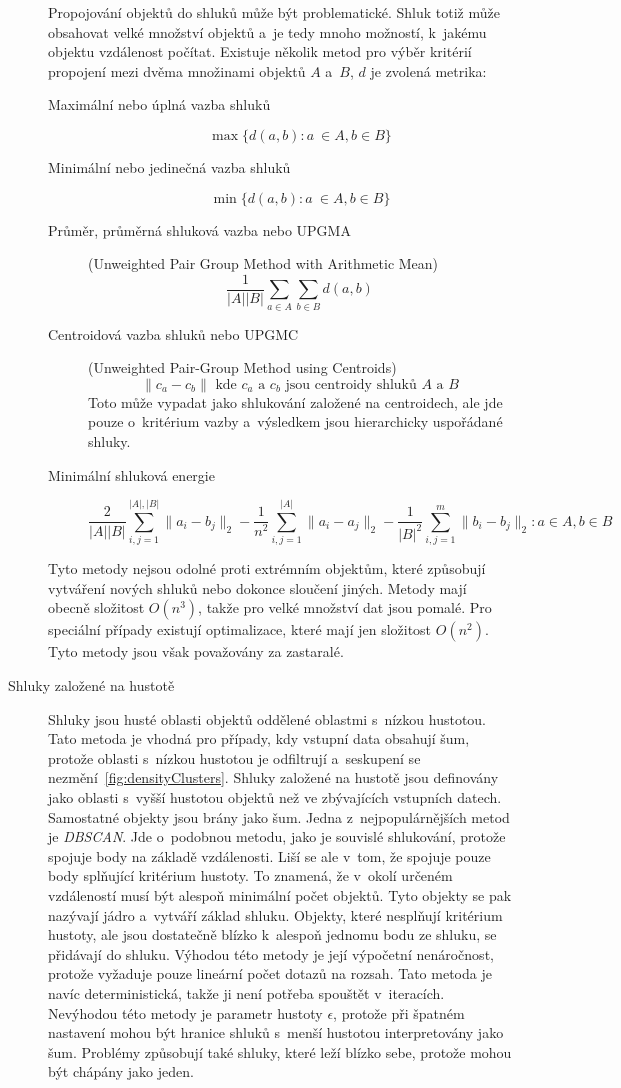 \begin{description}
Propojování objektů do shluků může být problematické. Shluk totiž může obsahovat velké množství objektů a~je tedy mnoho možností, k~jakému objektu vzdálenost počítat. Existuje několik metod pro výběr kritérií propojení mezi dvěma množinami objektů $A$ a~$B$, $d$ je zvolená metrika:
\begin{description}
\item[Maximální nebo úplná vazba shluků] $$\max\{d(a,b) : a~\in A, b \in B\}$$
\item[Minimální nebo jedinečná vazba shluků] $$\min\{d(a,b) : a~\in A, b \in B\}$$
\item[Průměr, průměrná shluková vazba nebo UPGMA] (Unweighted Pair Group Method with Arithmetic Mean) $$\frac{1}{|A||B|}\sum_{a \in A} \sum_{b \in B} d(a,b)$$
\item[Centroidová vazba shluků nebo UPGMC] (Unweighted Pair-Group Method using Centroids) $$\|c_a - c_b\| \mbox{ kde } c_a \mbox{ a } c_b \mbox{ jsou centroidy shluků } A \mbox{ a } B$$
Toto může vypadat jako shlukování založené na centroidech, ale jde pouze o~kritérium vazby a~výsledkem jsou hierarchicky uspořádané shluky.
\item[Minimální shluková energie] $$\frac{2}{|A||B|}\sum_{i,j=1}^{|A|,|B|}\|a_i-b_j\|_2-\frac{1}{n^2}\sum_{i,j=1}^{|A|}\|a_i-a_j\|_2-\frac{1}{|B|^2}\sum_{i,j=1}^{m}\|b_{i}-b_{j}\|_{2} : a \in A, b \in B$$
\end{description}

Tyto metody nejsou odolné proti extrémním objektům, které způsobují vytváření nových shluků nebo dokonce sloučení jiných. Metody mají obecně složitost $O(n^3) $, takže pro velké množství dat jsou pomalé. Pro speciální případy existují optimalizace, které mají jen složitost $O(n^2) $. Tyto metody jsou však považovány za zastaralé.

\item[Shluky založené na hustotě] Shluky jsou husté oblasti objektů oddělené oblastmi s~nízkou hustotou. Tato metoda je vhodná pro případy, kdy vstupní data obsahují šum, protože oblasti s~nízkou hustotou je odfiltrují a~seskupení se nezmění~\autoref{fig:densityClusters}.
Shluky založené na hustotě jsou definovány jako oblasti s~vyšší hustotou objektů než ve zbývajících vstupních datech. Samostatné objekty jsou brány jako šum. Jedna z~nejpopulárnějších metod je \textit{DBSCAN}. Jde o~podobnou metodu, jako je souvislé shlukování, protože spojuje body na základě vzdálenosti. Liší se ale v~tom, že spojuje pouze body splňující kritérium hustoty. To znamená, že v~okolí určeném vzdáleností musí být alespoň minimální počet objektů. Tyto objekty se pak nazývají jádro a~vytváří základ shluku. Objekty, které nesplňují kritérium hustoty, ale jsou dostatečně blízko k~alespoň jednomu bodu ze shluku, se přidávají do shluku.
Výhodou této metody je její výpočetní nenáročnost, protože vyžaduje pouze lineární počet dotazů na rozsah. Tato metoda je navíc deterministická, takže ji není potřeba spouštět v~iteracích.
Nevýhodou této metody je parametr hustoty $\epsilon$, protože při špatném nastavení mohou být hranice shluků s~menší hustotou interpretovány jako šum. Problémy způsobují také shluky, které leží blízko sebe, protože mohou být chápány jako jeden.


\end{description}
